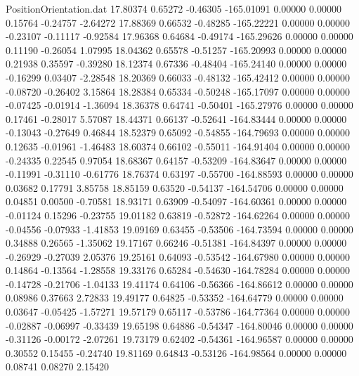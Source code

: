 \begin{filecontents}{PositionOrientation.dat}
  17.80374    0.65272   -0.46305  -165.01091    0.00000    0.00000    0.15764   -0.24757   -2.64272
  17.88369    0.66532   -0.48285  -165.22221    0.00000    0.00000   -0.23107   -0.11117   -0.92584
  17.96368    0.64684   -0.49174  -165.29626    0.00000    0.00000    0.11190   -0.26054    1.07995
  18.04362    0.65578   -0.51257  -165.20993    0.00000    0.00000    0.21938    0.35597   -0.39280
  18.12374    0.67336   -0.48404  -165.24140    0.00000    0.00000   -0.16299    0.03407   -2.28548
  18.20369    0.66033   -0.48132  -165.42412    0.00000    0.00000   -0.08720   -0.26402    3.15864
  18.28384    0.65334   -0.50248  -165.17097    0.00000    0.00000   -0.07425   -0.01914   -1.36094
  18.36378    0.64741   -0.50401  -165.27976    0.00000    0.00000    0.17461   -0.28017    5.57087
  18.44371    0.66137   -0.52641  -164.83444    0.00000    0.00000   -0.13043   -0.27649    0.46844
  18.52379    0.65092   -0.54855  -164.79693    0.00000    0.00000    0.12635   -0.01961   -1.46483
  18.60374    0.66102   -0.55011  -164.91404    0.00000    0.00000   -0.24335    0.22545    0.97054
  18.68367    0.64157   -0.53209  -164.83647    0.00000    0.00000   -0.11991   -0.31110   -0.61776
  18.76374    0.63197   -0.55700  -164.88593    0.00000    0.00000    0.03682    0.17791    3.85758
  18.85159    0.63520   -0.54137  -164.54706    0.00000    0.00000    0.04851    0.00500   -0.70581
  18.93171    0.63909   -0.54097  -164.60361    0.00000    0.00000   -0.01124    0.15296   -0.23755
  19.01182    0.63819   -0.52872  -164.62264    0.00000    0.00000   -0.04556   -0.07933   -1.41853
  19.09169    0.63455   -0.53506  -164.73594    0.00000    0.00000    0.34888    0.26565   -1.35062
  19.17167    0.66246   -0.51381  -164.84397    0.00000    0.00000   -0.26929   -0.27039    2.05376
  19.25161    0.64093   -0.53542  -164.67980    0.00000    0.00000    0.14864   -0.13564   -1.28558
  19.33176    0.65284   -0.54630  -164.78284    0.00000    0.00000   -0.14728   -0.21706   -1.04133
  19.41174    0.64106   -0.56366  -164.86612    0.00000    0.00000    0.08986    0.37663    2.72833
  19.49177    0.64825   -0.53352  -164.64779    0.00000    0.00000    0.03647   -0.05425   -1.57271
  19.57179    0.65117   -0.53786  -164.77364    0.00000    0.00000   -0.02887   -0.06997   -0.33439
  19.65198    0.64886   -0.54347  -164.80046    0.00000    0.00000   -0.31126   -0.00172   -2.07261
  19.73179    0.62402   -0.54361  -164.96587    0.00000    0.00000    0.30552    0.15455   -0.24740
  19.81169    0.64843   -0.53126  -164.98564    0.00000    0.00000    0.08741    0.08270    2.15420

\end{filecontents}
